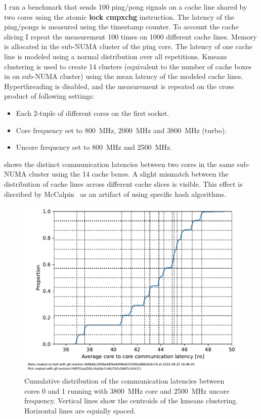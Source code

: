 I run a benchmark that sends \SI{100}{} ping/pong signals on a cache line shared by two cores using the atomic \textbf{lock cmpxchg} instruction.
The latency of the ping/pongs is measured using the timestamp counter.
To account the cache slicing I repeat the measurement \SI{100}{} times on \SI{1000}{} different cache lines.
Memory is allocated in the sub-NUMA cluster of the ping core.
The latency of one cache line is modeled using a normal distribution over all repetitions.
Kmeans clustering is used to create \SI{14}{} clusters (equivalent to the number of cache boxes in on sub-NUMA cluster) using the mean latency of the modeled cache lines.
Hyperthreading is disabled, and the measurement is repeated on the cross product of following settings:
\begin{itemize}
    \item Each 2-tuple of different cores on the first socket.
    \item Core frequency set to \SI{800}{\MHz}, \SI{2000}{\MHz} and \SI{3800}{\MHz} (turbo).
    \item Uncore frequency set to \SI{800}{\MHz} and \SI{2500}{\MHz}.
\end{itemize}

 shows the distinct communication latencies between two cores in the same sub-NUMA cluster using the \SI{14}{} cache boxes.
A slight mismatch between the distribution of cache lines across different cache slices is visible.
This effect is discribed by McCalpin~\cite{TODO} as an artifact of using specific hash algorithms.

\begin{figure}[]
    \centering
    \includegraphics[width=0.8\columnwidth]{fig/core-to-core-latency/core0to1latency.pdf}
    \caption{\label{fig:cbo-latencies}Cumulative distribution of the communication latencies between cores 0 and 1 running with \SI{3800}{\MHz} core and \SI{2500}{\MHz} uncore frequency.
    Vertical lines show the centroids of the kmeans clustering.
    Horizontal lines are equially spaced.}
\end{figure}


